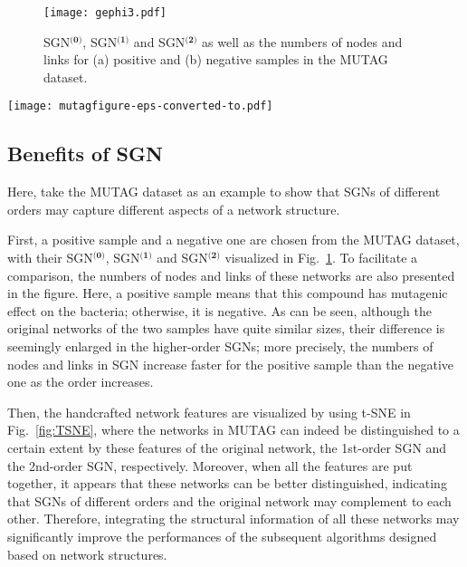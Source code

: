\documentclass[10pt,journal,compsoc]{IEEEtran}
\begin{document}
\begin{figure}[!t]
  \centering
  \texttt{[image: gephi3.pdf]}
  \caption{SGN$^{\textbf{(0)}}$, SGN$^{\textbf{(1)}}$ and SGN$^{\textbf{(2)}}$ as well as the numbers of nodes and links for (a) positive and (b) negative samples in the MUTAG dataset.}
  \label{gephi}
\end{figure}

\begin{figure*}[!t]
	\centering
	\texttt{[image: mutagfigure-eps-converted-to.pdf]}
	\caption{The t-SNE visualization of handcrafted network features. The same color of points represent the same class of networks in MUTAG.}
	\label{fig:TSNE}
\end{figure*}

\subsection{Benefits of SGN}

Here, take the MUTAG dataset as an example to show that SGNs of different orders may capture different aspects of a network structure.

First, a positive sample and a negative one are chosen from the MUTAG dataset, with their SGN$^{\textbf{(0)}}$, SGN$^{\textbf{(1)}}$ and SGN$^{\textbf{(2)}}$ visualized in Fig.~\ref{gephi}. To facilitate a comparison, the numbers of nodes and links of these networks are also presented in the figure. Here, a positive sample means that this compound has mutagenic effect on the bacteria; otherwise, it is negative. As can be seen, although the original networks of the two samples have quite similar sizes, their difference is seemingly enlarged in the higher-order SGNs; more precisely, the numbers of nodes and links in SGN increase faster for the positive sample than the negative one as the order increases.

Then, the handcrafted network features are visualized by using t-SNE in Fig.~\ref{fig:TSNE}, where the networks in MUTAG can indeed be distinguished to a certain extent by these features of the original network, the 1st-order SGN and the 2nd-order SGN, respectively. Moreover, when all the features are put together, it appears that these networks can be better distinguished, indicating that SGNs of different orders and the original network may complement to each other. Therefore, integrating the structural information of all these networks may significantly improve the performances of the subsequent algorithms designed based on network structures.
\end{document}
